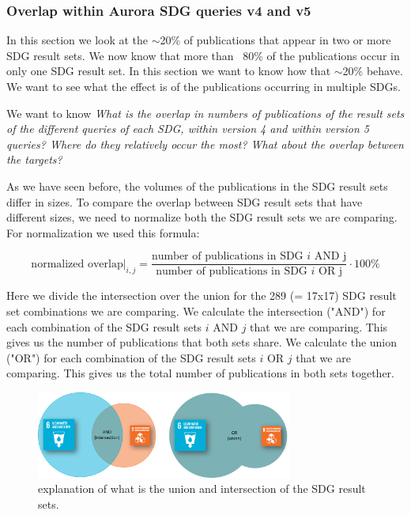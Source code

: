 \documentclass{article}
\begin{document}
\subsubsection{Overlap within Aurora SDG queries v4 and v5}
In this section we look at the $\sim$20\% of publications that appear in two or more SDG result sets. We now know that more than ~80\% of the publications occur in only one SDG result set. In this section we want to know how that $\sim$20\% behave. We want to see what the effect is of the publications occurring in multiple SDGs.

We want to know \emph{What is the overlap in numbers of publications of the result sets of the different queries of each SDG, within version 4 and within version 5 queries? Where do they relatively occur the most? What about the overlap between the targets?}

As we have seen before, the volumes of the publications in the SDG result sets differ in sizes. To compare the overlap between SDG result sets that have different sizes, we need to normalize both the SDG result sets we are comparing. For normalization we used this formula:

\begin{equation*}
    \left.\text{normalized overlap}\right|_{i,j} = \frac{\text{number of publications in SDG $i$ AND j}}{\text{number of publications in SDG $i$ OR j}}\cdot 100\%
\end{equation*}

Here we divide the intersection over the union for the 289 (= 17x17) SDG result set combinations we are comparing. 
We calculate the intersection ("AND") for each combination of the SDG result sets $i$ AND $j$ that we are comparing. This gives us the number of publications that both sets share.
We calculate the union ("OR") for each combination of the SDG result sets $i$ OR $j$ that we are comparing. This gives us the total number of publications in both sets together.

\begin{figure}[H]
	\centering
  \includegraphics[width=0.75\textwidth]{figures/SDG-OR-AND-venn-diagrams.png}
	\caption{explanation of what is the union and intersection of the SDG result sets.}
\end{figure}
\end{document}
